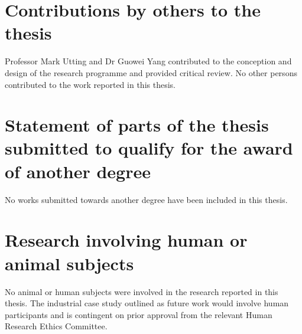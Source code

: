 \section*{Contributions by others to the thesis}

Professor Mark Utting and Dr Guowei Yang contributed to the conception and design
of the research programme and provided critical review. No other persons
contributed to the work reported in this thesis.

\section*{Statement of parts of the thesis submitted to qualify for the award of
another degree}

No works submitted towards another degree have been included in this thesis.

\section*{Research involving human or animal subjects}

No animal or human subjects were involved in the research reported in this thesis.
The industrial case study outlined as future work would involve human participants
and is contingent on prior approval from the relevant Human Research Ethics
Committee.
